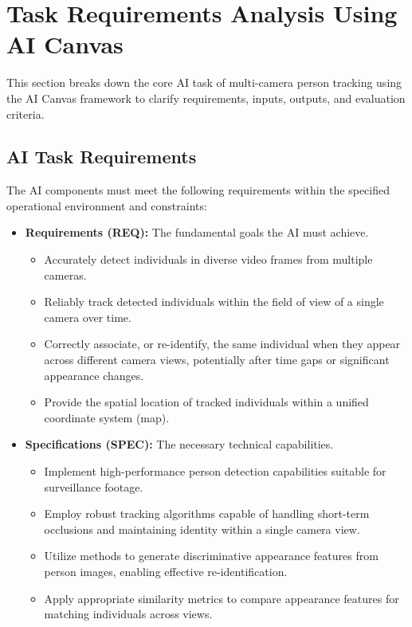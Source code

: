 \section{Task Requirements Analysis Using AI Canvas}
\label{section:task_analysis} %
This section breaks down the core AI task of multi-camera person tracking using the AI Canvas framework to clarify requirements, inputs, outputs, and evaluation criteria.

\subsection{AI Task Requirements}
\label{subsection:ai_task_reqs} %
The AI components must meet the following requirements within the specified operational environment and constraints:
\begin{itemize}
    \item \textbf{Requirements (REQ):} The fundamental goals the AI must achieve.
        \begin{itemize}
            \item Accurately detect individuals in diverse video frames from multiple cameras.
            \item Reliably track detected individuals within the field of view of a single camera over time.
            \item Correctly associate, or re-identify, the same individual when they appear across different camera views, potentially after time gaps or significant appearance changes.
            \item Provide the spatial location of tracked individuals within a unified coordinate system (map).
        \end{itemize}
    \item \textbf{Specifications (SPEC):} The necessary technical capabilities.
        \begin{itemize}
            \item Implement high-performance person detection capabilities suitable for surveillance footage.
            \item Employ robust tracking algorithms capable of handling short-term occlusions and maintaining identity within a single camera view.
            \item Utilize methods to generate discriminative appearance features from person images, enabling effective re-identification.
            \item Apply appropriate similarity metrics to compare appearance features for matching individuals across views.

\end{itemize}
\end{itemize}
